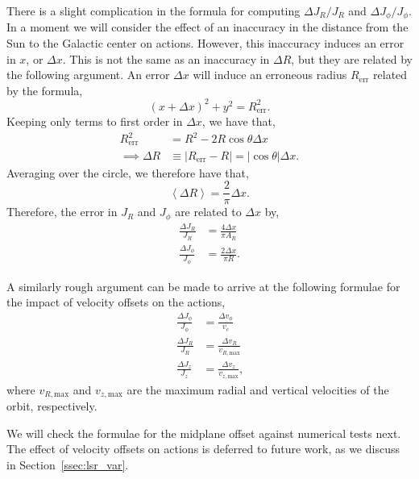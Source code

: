 \documentclass[twocolumn]{aastex62}
\newcommand{\abs}[1]{\left| #1 \right|}
\newcommand{\avg}[1]{\left< #1 \right>}
\newcommand{\beq}{\begin{equation}}
\newcommand{\eeq}{\end{equation}}
\begin{document}
There is a slight complication in the formula for computing $\Delta J_R/J_R$
and $\Delta J_{\phi}/J_{\phi}$. In a moment we will consider the effect of an inaccuracy
in the distance from the Sun to the Galactic center on actions. However, this
inaccuracy induces an error in $x$, or $\Delta x$. This is not the same as an
inaccuracy in $\Delta R$, but they are related by the following argument. An
error $\Delta x$ will induce an erroneous radius $R_{\text{err}}$ related by
the formula,
\beq
(x+\Delta x)^2 + y^2 = R_{\text{err}}^2\text{.}
\eeq
Keeping only terms to first order in $\Delta x$, we have that,
\beq
\begin{split}
R_{\text{err}}^2 &= R^2 - 2 R \cos{\theta} \Delta x \\
\implies \Delta R &\equiv \abs{R_{\text{err}} - R} = \abs{\cos{\theta}} \Delta x\text{.}
\end{split}
\eeq
Averaging over the circle, we therefore have that,
\beq
\avg{\Delta R} = \frac{2}{\pi} \Delta x\text{.}
\eeq
Therefore, the error in $J_R$ and $J_{\phi}$ are related to $\Delta x$ by,
\beq\label{eq:Jr_epi_dx}
\begin{split}
\frac{\Delta J_R}{J_R} &= \frac{4 \Delta x}{\pi A_R} \\
\frac{\Delta J_{\phi}}{J_{\phi}} &= \frac{2 \Delta x}{\pi R}\text{.}
\end{split}
\eeq

A similarly rough argument can be made to arrive at the following formulae for
the impact of velocity offsets on the actions,
\beq\label{eq:actions_epi_error}
\begin{split}
\frac{\Delta J_{\phi}}{J_{\phi}} &= \frac{\Delta v_{\phi}}{v_c} \\
\frac{\Delta J_R}{J_R} &= \frac{\Delta v_R}{v_{R,\text{max}}} \\
\frac{\Delta J_z}{J_z} &= \frac{\Delta v_z}{v_{z,\text{max}}}\text{,}
\end{split}
\eeq
where $v_{R,\text{max}}$ and $v_{z,\text{max}}$ are the maximum radial and
vertical velocities of the orbit, respectively.

We will check the formulae for the midplane offset against numerical tests
next. The effect of velocity offsets on actions is deferred to future work, as
we discuss in Section~\ref{ssec:lsr_var}.
\end{document}

